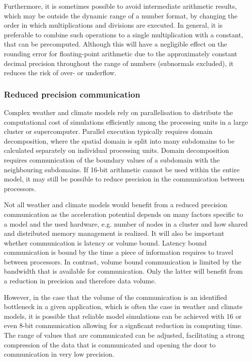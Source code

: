 \documentclass[draft]{agujournal2019}
\begin{document}
Furthermore, it is sometimes possible to avoid intermediate arithmetic results, which may be outside the dynamic range of a number format, by changing the order in which multiplications and divisions are executed. In general, it is preferable to combine such operations to a single multiplication with a constant, that can be precomputed. Although this will have a negligible effect on the rounding error for floating-point arithmetic due to the approximately constant decimal precision throughout the range of numbers (subnormals excluded), it reduces the risk of over- or underflow.

\subsubsection{Reduced precision communication}

Complex weather and climate models rely on parallelisation to distribute the computational cost of simulations efficiently among the processing units in a large cluster or supercomputer. Parallel execution typically requires domain decomposition, where the spatial domain is split into many subdomains to be calculated separately on individual processing units. Domain decomposition requires communication of the boundary values of a subdomain with the neighbouring subdomains. If 16-bit arithmetic cannot be used within the entire model, it may still be possible to reduce precision in the communication between processors.

Not all weather and climate models would benefit from a reduced precision communication as the acceleration potential depends on many factors specific to a model and the used hardware, e.g. number of nodes in a cluster and how shared and distributed memory management is realized. It will also be important whether communication is latency or volume bound. Latency bound communication is bound by the time a piece of information requires to travel between processors. In contrast, volume bound communication is limited by the bandwidth that is available for communication. Only the latter will benefit from a reduction in precision and therefore data volume.

However, in the case that the volume of the communication is an identified bottleneck in a given application, which is often the case in weather and climate models, it is possible that reliable model simulations can be achieved with 16 or even 8-bit communication allowing for a signficant reduction in computing time. The range of values that are communicated can be adjusted, facilitating a strong compression of the data that is communicated and opening the door to communication in very low precision.
\end{document}

